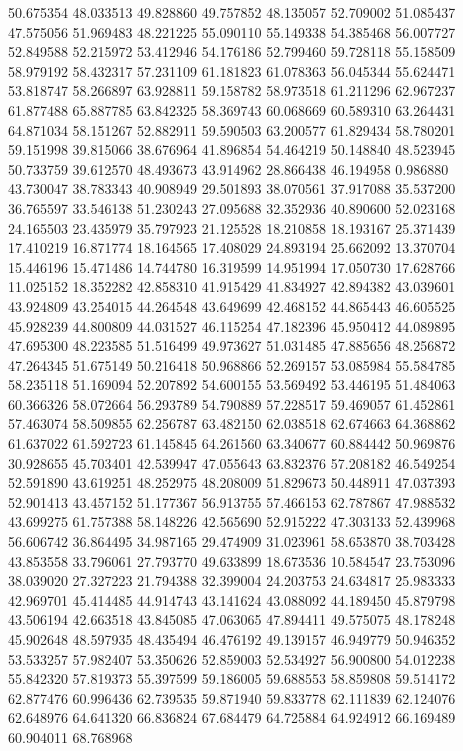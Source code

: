 50.675354
48.033513
49.828860
49.757852
48.135057
52.709002
51.085437
47.575056
51.969483
48.221225
55.090110
55.149338
54.385468
56.007727
52.849588
52.215972
53.412946
54.176186
52.799460
59.728118
55.158509
58.979192
58.432317
57.231109
61.181823
61.078363
56.045344
55.624471
53.818747
58.266897
63.928811
59.158782
58.973518
61.211296
62.967237
61.877488
65.887785
63.842325
58.369743
60.068669
60.589310
63.264431
64.871034
58.151267
52.882911
59.590503
63.200577
61.829434
58.780201
59.151998
39.815066
38.676964
41.896854
54.464219
50.148840
48.523945
50.733759
39.612570
48.493673
43.914962
28.866438
46.194958
0.986880
43.730047
38.783343
40.908949
29.501893
38.070561
37.917088
35.537200
36.765597
33.546138
51.230243
27.095688
32.352936
40.890600
52.023168
24.165503
23.435979
35.797923
21.125528
18.210858
18.193167
25.371439
17.410219
16.871774
18.164565
17.408029
24.893194
25.662092
13.370704
15.446196
15.471486
14.744780
16.319599
14.951994
17.050730
17.628766
11.025152
18.352282
42.858310
41.915429
41.834927
42.894382
43.039601
43.924809
43.254015
44.264548
43.649699
42.468152
44.865443
46.605525
45.928239
44.800809
44.031527
46.115254
47.182396
45.950412
44.089895
47.695300
48.223585
51.516499
49.973627
51.031485
47.885656
48.256872
47.264345
51.675149
50.216418
50.968866
52.269157
53.085984
55.584785
58.235118
51.169094
52.207892
54.600155
53.569492
53.446195
51.484063
60.366326
58.072664
56.293789
54.790889
57.228517
59.469057
61.452861
57.463074
58.509855
62.256787
63.482150
62.038518
62.674663
64.368862
61.637022
61.592723
61.145845
64.261560
63.340677
60.884442
50.969876
30.928655
45.703401
42.539947
47.055643
63.832376
57.208182
46.549254
52.591890
43.619251
48.252975
48.208009
51.829673
50.448911
47.037393
52.901413
43.457152
51.177367
56.913755
57.466153
62.787867
47.988532
43.699275
61.757388
58.148226
42.565690
52.915222
47.303133
52.439968
56.606742
36.864495
34.987165
29.474909
31.023961
58.653870
38.703428
43.853558
33.796061
27.793770
49.633899
18.673536
10.584547
23.753096
38.039020
27.327223
21.794388
32.399004
24.203753
24.634817
25.983333
42.969701
45.414485
44.914743
43.141624
43.088092
44.189450
45.879798
43.506194
42.663518
43.845085
47.063065
47.894411
49.575075
48.178248
45.902648
48.597935
48.435494
46.476192
49.139157
46.949779
50.946352
53.533257
57.982407
53.350626
52.859003
52.534927
56.900800
54.012238
55.842320
57.819373
55.397599
59.186005
59.688553
58.859808
59.514172
62.877476
60.996436
62.739535
59.871940
59.833778
62.111839
62.124076
62.648976
64.641320
66.836824
67.684479
64.725884
64.924912
66.169489
60.904011
68.768968
